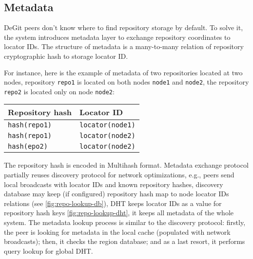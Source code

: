 \documentclass[acmlarge, screen, nonacm]{acmart}
\newcommand{\code}[1]{\texttt{#1}}
\begin{document}
\subsection{Metadata}
\label{sec:metadata}

DeGit peers don't know where to find repository storage by default.
To solve it, the system introduces metadata layer to exchange repository coordinates
to locator IDs. The structure of metadata is a many-to-many relation of
repository cryptographic hash to storage locator ID.

For instance, here is the example of metadata of two repositories located at two nodes,
repository \code{repo1} is located on both nodes \code{node1} and \code{node2},
the repository \code{repo2} is located only on node \code{node2}:

\begin{tabular}{l | l}
  Repository hash & Locator ID \\ \hline
  \code{hash(repo1)} & \code{locator(node1)} \\
  \code{hash(repo1)} & \code{locator(node2)} \\
  \code{hash(epo2)} & \code{locator(node2)} \\
\end{tabular}

The repository hash is encoded in Multihash format. Metadata exchange protocol partially reuses
discovery protocol for network optimizations, e.g., peers send local broadcasts
with locator IDs and known repository hashes, discovery database may keep (if configured)
repository hash map to node locator IDs relations (see \ref{fig:repo-lookup-db}),
DHT keeps locator IDs as a value for repository hash keys \ref{fig:repo-lookup-dht},
it keeps all metadata of the whole system. The metadata lookup process is similar to the discovery protocol:
firstly, the peer is looking for metadata in the local cache (populated with network broadcasts); then, it checks
the region database; and as a last resort, it performs query lookup for global DHT.
\end{document}
